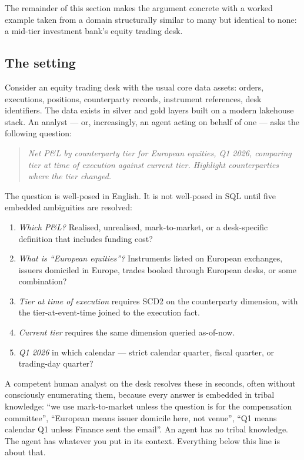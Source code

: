 \documentclass[11pt,a4paper]{article}
\begin{document}
The remainder of this section makes the argument concrete with a worked example taken from a domain structurally similar to many but identical to none: a mid-tier investment bank's equity trading desk.

\subsection{The setting}

Consider an equity trading desk with the usual core data assets: orders, executions, positions, counterparty records, instrument references, desk identifiers. The data exists in silver and gold layers built on a modern lakehouse stack. An analyst --- or, increasingly, an agent acting on behalf of one --- asks the following question:

\begin{quote}
\itshape
Net P\&L by counterparty tier for European equities, Q1 2026, comparing tier at time of execution against current tier. Highlight counterparties where the tier changed.
\end{quote}

The question is well-posed in English. It is not well-posed in SQL until five embedded ambiguities are resolved:

\begin{enumerate}[leftmargin=*, itemsep=2pt]
  \item \emph{Which P\&L?} Realised, unrealised, mark-to-market, or a desk-specific definition that includes funding cost?
  \item \emph{What is ``European equities''?} Instruments listed on European exchanges, issuers domiciled in Europe, trades booked through European desks, or some combination?
  \item \emph{Tier at time of execution} requires SCD2 on the counterparty dimension, with the tier-at-event-time joined to the execution fact.
  \item \emph{Current tier} requires the same dimension queried as-of-now.
  \item \emph{Q1 2026} in which calendar --- strict calendar quarter, fiscal quarter, or trading-day quarter?
\end{enumerate}

A competent human analyst on the desk resolves these in seconds, often without consciously enumerating them, because every answer is embedded in tribal knowledge: ``we use mark-to-market unless the question is for the compensation committee'', ``European means issuer domicile here, not venue'', ``Q1 means calendar Q1 unless Finance sent the email''. An agent has no tribal knowledge. The agent has whatever you put in its context. Everything below this line is about that.
\end{document}
